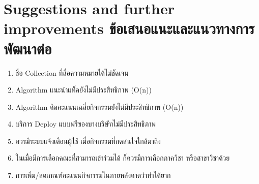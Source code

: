 \section{\ifenglish%
Suggestions and further improvements
\else%
ข้อเสนอแนะและแนวทางการพัฒนาต่อ
\fi
}

\begin{enumerate}
    \item ชื่อ Collection ที่สื่อความหมายได้ไม่ชัดเจน
    \item Algorithm แนะนำแท็คยังไม่มีประสิทธิภาพ (O(n))
    \item Algorithm คิดคะแนนเฉลี่ยกิจกรรมยังไม่มีประสิทธิภาพ (O(n))
    \item บริการ Deploy แบบฟรีของบางบริษัทไม่มีประสิทธิภาพ
    \item ควรมีระบบแจ้งเตือนผู้ใช้ เมื่อกิจกรรมที่กดสนใจใกล้มาถึง
    \item ในเมื่อมีการเลือกคณะที่สามารถเข้าร่วมได้ ก็ควรมีการเลือกภาควิชา หรือสาขาวิชาด้วย
    \item การเพิ่ม/ลดเกณฑ์คะแนนกิจกรรมในภายหลังคาดว่าทำได้ยาก
\end{enumerate}
